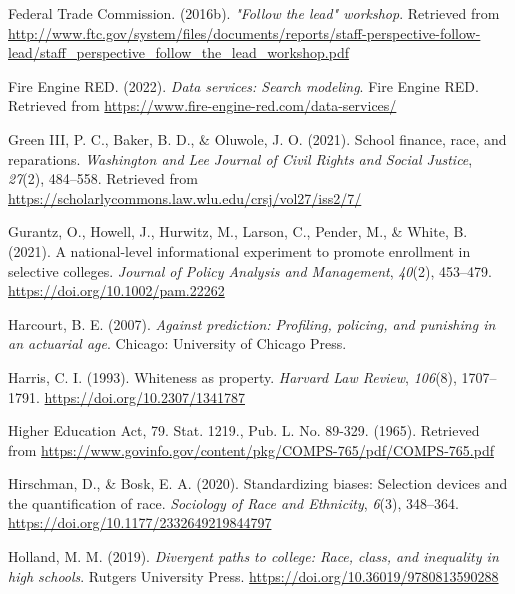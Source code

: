 \documentclass[
  12pt,
]{article}
\newlength{\cslhangindent}
\newlength{\cslentryspacingunit} %
\newenvironment{CSLReferences}[2] %
 {%
  \setlength{\parindent}{0pt}
  \ifodd #1
  \let\oldpar\par
  \def\par{\hangindent=\cslhangindent\oldpar}
  \fi
  \setlength{\parskip}{#2\cslentryspacingunit}
 }%
 {}
\begin{document}
\begin{CSLReferences}{1}{0}
\leavevmode{}%
Federal Trade Commission. (2016b). \emph{"Follow the lead" workshop}. Retrieved from \url{http://www.ftc.gov/system/files/documents/reports/staff-perspective-follow-lead/staff_perspective_follow_the_lead_workshop.pdf}

\leavevmode{}%
Fire Engine RED. (2022). \emph{Data services: Search modeling}. Fire Engine RED. Retrieved from \url{https://www.fire-engine-red.com/data-services/}

\leavevmode{}%
Green III, P. C., Baker, B. D., \& Oluwole, J. O. (2021). School finance, race, and reparations. \emph{Washington and Lee Journal of Civil Rights and Social Justice}, \emph{27}(2), 484--558. Retrieved from \url{https://scholarlycommons.law.wlu.edu/crsj/vol27/iss2/7/}

\leavevmode{}%
Gurantz, O., Howell, J., Hurwitz, M., Larson, C., Pender, M., \& White, B. (2021). A national-level informational experiment to promote enrollment in selective colleges. \emph{Journal of Policy Analysis and Management}, \emph{40}(2), 453--479. \url{https://doi.org/10.1002/pam.22262}

\leavevmode{}%
Harcourt, B. E. (2007). \emph{Against prediction: Profiling, policing, and punishing in an actuarial age}. Chicago: University of Chicago Press.

\leavevmode{}%
Harris, C. I. (1993). Whiteness as property. \emph{Harvard Law Review}, \emph{106}(8), 1707--1791. \url{https://doi.org/10.2307/1341787}

\leavevmode{}%
Higher Education Act, 79. Stat. 1219., Pub. L. No. 89-329. (1965). Retrieved from \url{https://www.govinfo.gov/content/pkg/COMPS-765/pdf/COMPS-765.pdf}

\leavevmode{}%
Hirschman, D., \& Bosk, E. A. (2020). Standardizing biases: Selection devices and the quantification of race. \emph{Sociology of Race and Ethnicity}, \emph{6}(3), 348--364. \url{https://doi.org/10.1177/2332649219844797}

\leavevmode{}%
Holland, M. M. (2019). \emph{Divergent paths to college: Race, class, and inequality in high schools}. Rutgers University Press. \url{https://doi.org/10.36019/9780813590288}


\end{CSLReferences}
\end{document}
